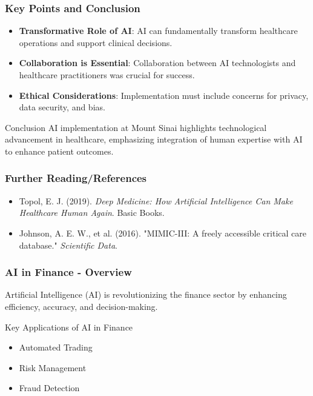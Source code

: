 \documentclass{beamer}
\begin{document}
\begin{frame}[fragile]
    \frametitle{Key Points and Conclusion}
    \begin{itemize}
        \item \textbf{Transformative Role of AI}: AI can fundamentally transform healthcare operations and support clinical decisions.
        \item \textbf{Collaboration is Essential}: Collaboration between AI technologists and healthcare practitioners was crucial for success.
        \item \textbf{Ethical Considerations}: Implementation must include concerns for privacy, data security, and bias.
    \end{itemize}
    
    \begin{block}{Conclusion}
        AI implementation at Mount Sinai highlights technological advancement in healthcare, emphasizing integration of human expertise with AI to enhance patient outcomes.
    \end{block}
\end{frame}

\begin{frame}[fragile]
    \frametitle{Further Reading/References}
    \begin{itemize}
        \item Topol, E. J. (2019). \textit{Deep Medicine: How Artificial Intelligence Can Make Healthcare Human Again}. Basic Books.
        \item Johnson, A. E. W., et al. (2016). "MIMIC-III: A freely accessible critical care database." \textit{Scientific Data}.
    \end{itemize}
\end{frame}

\begin{frame}[fragile]
    \frametitle{AI in Finance - Overview}
    Artificial Intelligence (AI) is revolutionizing the finance sector by enhancing efficiency, accuracy, and decision-making.
    
    \begin{block}{Key Applications of AI in Finance}
        \begin{itemize}
            \item Automated Trading
            \item Risk Management
            \item Fraud Detection
        \end{itemize}
    \end{block}
\end{frame}
\end{document}

